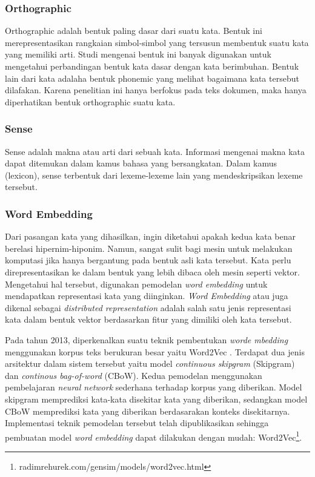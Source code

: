 \subsubsection{Orthographic}
Orthographic adalah bentuk paling dasar dari suatu kata. Bentuk ini merepresentasikan rangkaian simbol-simbol yang tersusun membentuk suatu kata yang memiliki arti. Studi mengenai bentuk ini banyak digunakan untuk mengetahui perbandingan bentuk kata dasar dengan kata berimbuhan. Bentuk lain dari kata adalaha bentuk phonemic yang melihat bagaimana kata tersebut dilafakan. Karena penelitian ini hanya berfokus pada teks dokumen, maka hanya diperhatikan bentuk orthographic suatu kata.

\subsubsection{Sense}
Sense adalah makna atau arti dari sebuah kata. Informasi mengenai makna kata dapat ditemukan dalam kamus bahasa yang bersangkatan. Dalam kamus (lexicon), sense terbentuk dari lexeme-lexeme lain yang mendeskripsikan lexeme tersebut. 

\subsubsection{Word Embedding}
Dari pasangan kata yang dihasilkan, ingin diketahui apakah kedua kata benar berelasi hipernim-hiponim. Namun, sangat sulit bagi mesin untuk melakukan komputasi jika hanya bergantung pada bentuk asli kata tersebut. Kata perlu direpresentasikan ke dalam bentuk yang lebih dibaca oleh mesin seperti vektor. Mengetahui hal tersebut, digunakan pemodelan \textit{word embedding} untuk mendapatkan representasi kata yang diinginkan. \textit{Word Embedding} atau juga dikenal sebagai \textit{distributed representation} adalah salah satu jenis representasi kata dalam bentuk vektor berdasarkan fitur yang dimiliki oleh kata tersebut. 

Pada tahun 2013, diperkenalkan suatu teknik pembentukan \textit{worde mbedding} menggunakan korpus teks berukuran besar yaitu Word2Vec \cite{mikolov2013distributed}. Terdapat dua jenis arsitektur dalam sistem tersebut yaitu model \textit{continuous skipgram} (Skipgram) dan \textit{continous bag-of-word} (CBoW). Kedua pemodelan menggunakan pembelajaran \textit{neural network} sederhana terhadap korpus yang diberikan. Model skipgram memprediksi kata-kata disekitar kata yang diberikan, sedangkan model CBoW memprediksi kata yang diberikan berdasarakan konteks disekitarnya. Implementasi teknik pemodelan tersebut telah dipublikasikan sehingga pembuatan model \textit{word embedding} dapat dilakukan dengan mudah: Word2Vec\footnote{radimrehurek.com/gensim/models/word2vec.html}.

